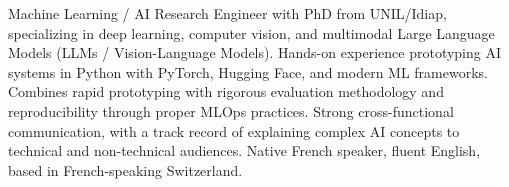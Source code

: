 


\begin{cvparagraph}
Machine Learning / AI Research Engineer with PhD from UNIL/Idiap, specializing in deep learning, computer vision, and multimodal Large Language Models (LLMs / Vision-Language Models). Hands-on experience prototyping AI systems in Python with PyTorch, Hugging Face, and modern ML frameworks. Combines rapid prototyping with rigorous evaluation methodology and reproducibility through proper MLOps practices. Strong cross-functional communication, with a track record of explaining complex AI concepts to technical and non-technical audiences. Native French speaker, fluent English, based in French-speaking Switzerland.
\end{cvparagraph}
